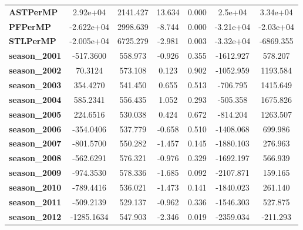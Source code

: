 \begin{center}
\begin{tabular}{lcccccc}
\textbf{ASTPerMP}             &     2.92e+04  &     2141.427     &    13.634  &         0.000        &      2.5e+04    &     3.34e+04     \\
\textbf{PFPerMP}              &   -2.622e+04  &     2998.639     &    -8.744  &         0.000        &    -3.21e+04    &    -2.03e+04     \\
\textbf{STLPerMP}             &   -2.005e+04  &     6725.279     &    -2.981  &         0.003        &    -3.32e+04    &    -6869.355     \\
\textbf{season\_2001}         &    -517.3600  &      558.973     &    -0.926  &         0.355        &    -1612.927    &      578.207     \\
\textbf{season\_2002}         &      70.3124  &      573.108     &     0.123  &         0.902        &    -1052.959    &     1193.584     \\
\textbf{season\_2003}         &     354.4270  &      541.450     &     0.655  &         0.513        &     -706.795    &     1415.649     \\
\textbf{season\_2004}         &     585.2341  &      556.435     &     1.052  &         0.293        &     -505.358    &     1675.826     \\
\textbf{season\_2005}         &     224.6516  &      530.038     &     0.424  &         0.672        &     -814.204    &     1263.507     \\
\textbf{season\_2006}         &    -354.0406  &      537.779     &    -0.658  &         0.510        &    -1408.068    &      699.986     \\
\textbf{season\_2007}         &    -801.5700  &      550.282     &    -1.457  &         0.145        &    -1880.103    &      276.963     \\
\textbf{season\_2008}         &    -562.6291  &      576.321     &    -0.976  &         0.329        &    -1692.197    &      566.939     \\
\textbf{season\_2009}         &    -974.3530  &      578.336     &    -1.685  &         0.092        &    -2107.871    &      159.165     \\
\textbf{season\_2010}         &    -789.4416  &      536.021     &    -1.473  &         0.141        &    -1840.023    &      261.140     \\
\textbf{season\_2011}         &    -509.2139  &      529.137     &    -0.962  &         0.336        &    -1546.303    &      527.875     \\
\textbf{season\_2012}         &   -1285.1634  &      547.903     &    -2.346  &         0.019        &    -2359.034    &     -211.293     \\

\end{tabular}
\end{center}
